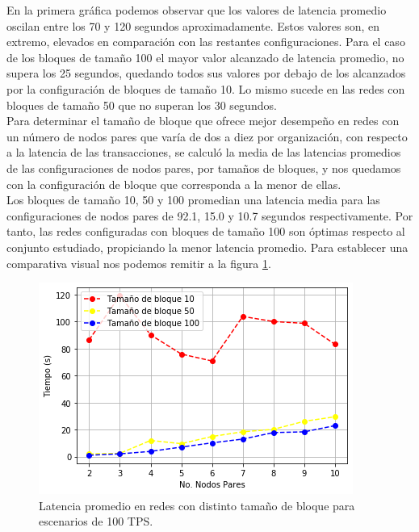En la primera gr\'afica podemos observar que los valores de latencia promedio oscilan entre los 70 y 120 segundos aproximadamente. Estos valores son, en extremo, elevados en comparaci\'on con las restantes configuraciones. Para el caso de los bloques de tama\~no 100 el mayor valor alcanzado de latencia promedio, no supera los 25 segundos, quedando todos sus valores por debajo de los alcanzados por la configuraci\'on de bloques de tama\~no 10. Lo mismo sucede en las redes con bloques de tama\~no 50 que no superan los 30 segundos.\\

Para determinar el tama\~no de bloque que ofrece mejor desempe\~no en redes con un n\'umero de nodos pares que var\'ia de dos a diez por organizaci\'on,  con respecto a la latencia de las transacciones, se calcul\'o la media de las latencias promedios de las configuraciones de nodos pares, por tama\~nos de bloques, y nos quedamos con la configuraci\'on de bloque que corresponda a la menor de ellas.\\

Los bloques de tama\~no 10, 50 y 100 promedian una latencia media para las configuraciones de nodos pares de 92.1, 15.0 y 10.7 segundos respectivamente. Por tanto, las redes configuradas con bloques de tama\~no 100 son \'optimas respecto al conjunto estudiado, propiciando la menor latencia promedio. Para establecer una comparativa visual nos podemos remitir a la figura \ref{ComparacionLatencia100TPS}.\\

\begin{figure}[h]
\centering
\includegraphics[scale=0.5]{Graphics/ComparacionLatencia100TPS.png}
\caption{Latencia promedio en redes con distinto tama\~no de bloque para escenarios de 100 TPS.}
\label{ComparacionLatencia100TPS}
\end{figure}

